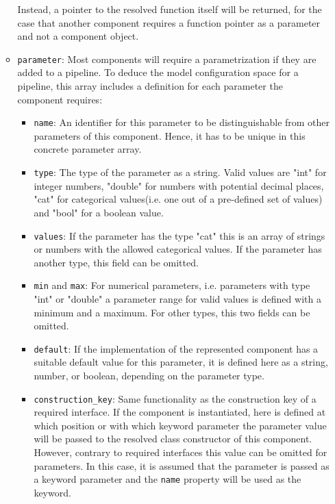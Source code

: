 \begin{itemize}
\begin{itemize}[label=\textbullet]
                Instead, a pointer to the resolved function itself will be returned, for the case that another component requires a function pointer as a parameter and not a component object.
            \item \texttt{parameter}: Most components will require a parametrization if they are added to a pipeline. To deduce the model configuration space for a pipeline, this array includes a definition for each parameter the component requires:
            \begin{itemize}[label=\textbullet]
                \item \texttt{name}: An identifier for this parameter to be distinguishable from other parameters of this component. Hence, it has to be unique in this concrete parameter array.
                \item \texttt{type}: The type of the parameter as a string. Valid values are "int" for integer numbers, "double" for numbers with potential decimal places, "cat" for categorical values(i.e. one out of a pre-defined set of values) and "bool" for a boolean value.
                \item \texttt{values}: If the parameter has the type "cat" this is an array of strings or numbers with the allowed categorical values. If the parameter has another type, this field can be omitted.
                \item \texttt{min} and \texttt{max}: For numerical parameters, i.e. parameters with type "int" or "double" a parameter range for valid values is defined with a minimum and a maximum. For other types, this two fields can be omitted.
                \item \texttt{default}: If the implementation of the represented component has a suitable default value for this parameter, it is defined here as a string, number, or boolean, depending on the parameter type.
                \item \texttt{construction\_key}: Same functionality as the construction key of a required interface.
                    If the component is instantiated, here is defined at which position or with which keyword parameter the parameter value will be passed to the resolved class constructor of this component.
                    However, contrary to required interfaces this value can be omitted for parameters.
                    In this case, it is assumed that the parameter is passed as a keyword parameter and the \texttt{name} property will be used as the keyword.
            \end{itemize}
        \end{itemize}
\end{itemize}

